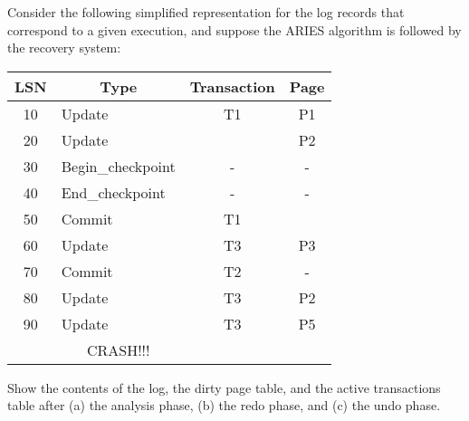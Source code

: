 {\color{gray}Consider the following simplified representation for the log records that correspond to a given execution, and suppose the ARIES algorithm is followed by the recovery system:}
\begin{table}[H]
\centering

{\color{gray}
\begin{tabular}{|c|l|c|c|}
\hline
\textbf{LSN}           & \multicolumn{1}{c|}{\textbf{Type}} & \textbf{Transaction}  & \textbf{Page}         \\ \hline
10                     & Update                             & T1                    & P1                    \\ \hline
20                     & Update                             &                       & P2                    \\ \hline
30                     & Begin\_checkpoint                  & -                     & -                     \\ \hline
40                     & End\_checkpoint                    & -                     & -                     \\ \hline
50                     & Commit                             & T1                    &                       \\ \hline
60                     & Update                             & T3                    & P3                    \\ \hline
70                     & Commit                             & T2                    & -                     \\ \hline
80                     & Update                             & T3                    & P2                    \\ \hline
90                     & Update                             & T3                    & P5                    \\ \hline
\multicolumn{1}{|l|}{} & \multicolumn{1}{c|}{CRASH!!!}      & \multicolumn{1}{l|}{} & \multicolumn{1}{l|}{} \\ \hline
\end{tabular}
}
\end{table}

{\color{gray}Show the contents of the log, the dirty page table, and the active transactions table after (a) the analysis phase, (b) the redo phase, and (c) the undo phase.}

